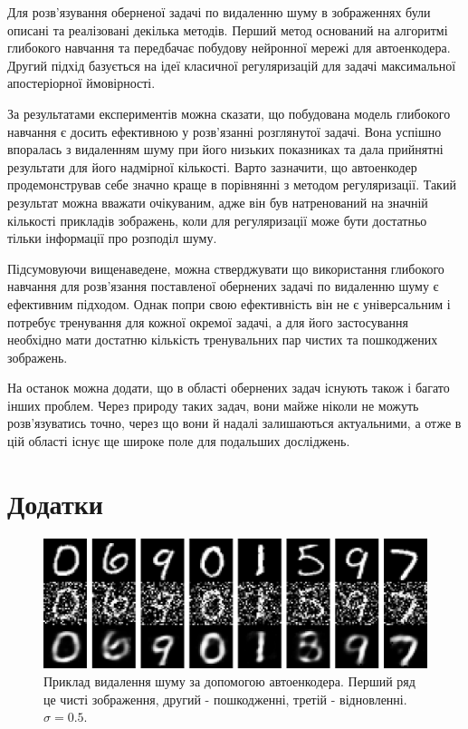 \documentclass[14pt,a4paper]{extarticle}
\newcounter{e}
\numberwithin{equation}{section}
\numberwithin{figure}{section}
\begin{document}
	Для розв'язування оберненої задачі по видаленню шуму в зображеннях були описані та реалізовані декілька методів. Перший метод оснований на алгоритмі глибокого навчання та передбачає побудову нейронної мережі для автоенкодера. Другий підхід базується на ідеї класичної регуляризацій для задачі максимальної апостеріорної ймовірності. 
	
	За результатами експериментів можна сказати, що побудована модель глибокого навчання є досить ефективною у розв'язанні розглянутої задачі. Вона успішно впоралась з видаленням шуму при його низьких показниках та дала прийнятні результати для його надмірної кількості. Варто зазначити, що автоенкодер продемонстрував себе значно краще в порівнянні з методом регуляризації. Такий результат можна вважати очікуваним, адже він був натренований на значній кількості прикладів зображень, коли для регуляризації може бути достатньо тільки інформації про розподіл шуму.
	
	Підсумовуючи вищенаведене, можна стверджувати що використання глибокого навчання для розв'язання поставленої обернених задачі по видаленню шуму є ефективним підходом. Однак попри свою ефективність він не є універсальним і потребує тренування для кожної окремої задачі, а для його застосування необхідно мати достатню кількість тренувальних пар чистих та пошкоджених зображень. 
	
	На останок можна додати, що в області обернених задач існують також і багато інших проблем. Через природу таких задач, вони майже ніколи не можуть розв'язуватись точно, через що вони й надалі залишаються актуальними, а отже в цій області існує ще широке поле для подальших досліджень.

	\newpage
	\thispagestyle{empty}
	\section*{Додатки}

	\begin{figure}[H]
		\centering
		\includegraphics[width=1\textwidth]{../resources/autoencoder-denoising-samples.pdf}
		\caption{Приклад видалення шуму за допомогою автоенкодера. Перший ряд це чисті зображення, другий - пошкодженні, третій - відновленні. $\sigma=0.5$.}
		\label{fig:autoencoder-denoising-samples}
	\end{figure}	
	
\end{document}
